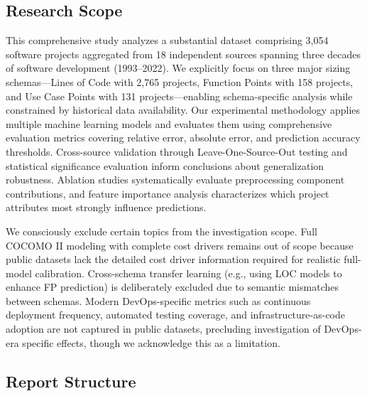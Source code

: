 \documentclass[11pt,a4paper]{article}
\begin{document}
\subsection{Research Scope}

This comprehensive study analyzes a substantial dataset comprising 3,054 software projects aggregated from 18 independent sources spanning three decades of software development (1993--2022). We explicitly focus on three major sizing schemas---Lines of Code with 2,765 projects, Function Points with 158 projects, and Use Case Points with 131 projects---enabling schema-specific analysis while constrained by historical data availability. Our experimental methodology applies multiple machine learning models and evaluates them using comprehensive evaluation metrics covering relative error, absolute error, and prediction accuracy thresholds. Cross-source validation through Leave-One-Source-Out testing and statistical significance evaluation inform conclusions about generalization robustness. Ablation studies systematically evaluate preprocessing component contributions, and feature importance analysis characterizes which project attributes most strongly influence predictions.

We consciously exclude certain topics from the investigation scope. Full COCOMO II modeling with complete cost drivers remains out of scope because public datasets lack the detailed cost driver information required for realistic full-model calibration. Cross-schema transfer learning (e.g., using LOC models to enhance FP prediction) is deliberately excluded due to semantic mismatches between schemas. Modern DevOps-specific metrics such as continuous deployment frequency, automated testing coverage, and infrastructure-as-code adoption are not captured in public datasets, precluding investigation of DevOps-era specific effects, though we acknowledge this as a limitation.

\subsection{Report Structure}
\end{document}
